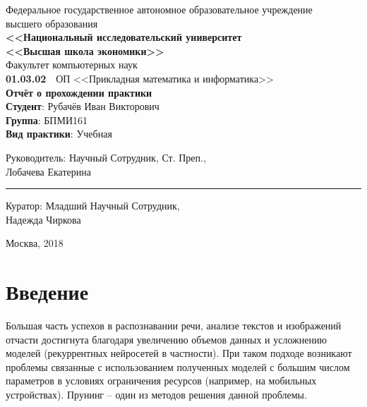 \documentclass[12pt]{article}
\begin{document}
\begin{titlepage}
  \center
  Федеральное государственное автономное образовательное учреждение\\
  высшего образования \\[.2cm]
  \textbf{\large <<Национальный исследовательский университет\\
    <<Высшая школа экономики>>}\\[.2cm]
  Факультет компьютерных наук\\[.2cm]
  \textbf{01.03.02}\ \  ОП <<Прикладная математика и информатика>>\\[4cm]
  \textbf{\LARGE Отчёт о прохождении практики}\\[2cm]
  {\flushleft
  \textbf{Студент}: Рубачёв Иван Викторович \\
  \textbf{Группа}: БПМИ161 \\
  \textbf{Вид практики}: Учебная\\[6cm]}

  \begin{multicols}{3}
    {\flushleft \scriptsize Руководитель:\vfill\columnbreak}
    {\flushleft \scriptsize Научный Сотрудник, Ст. Преп., \\[0.1em]}
    {\flushleft \scriptsize Лобачева Екатерина}
    {\vskip5mm\rule{5cm}{0.15mm}}
  \end{multicols}
  \begin{multicols}{3}
    {\flushleft \scriptsize Куратор:\vfill\columnbreak}
    {\flushleft \scriptsize Младший Научный Сотрудник, \\}
    {\flushleft \scriptsize Надежда Чиркова}
  \end{multicols}
  Москва, 2018
\end{titlepage}

{
\hypersetup{linkcolor=black}
\tableofcontents
}

\newpage

\section*{Введение}
%
Большая часть успехов в распознавании речи, анализе текстов и изображений отчасти достигнута благодаря
увеличению объемов данных и усложнению моделей (рекуррентных нейросетей в частности). При таком подходе
возникают проблемы связанные с использованием полученных моделей с большим числом параметров в условиях ограничения ресурсов
(например, на мобильных устройствах). Прунинг -- один из методов решения данной проблемы.
\end{document}
